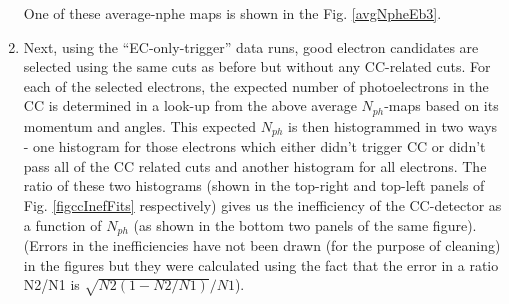 \begin{enumerate}
One of these average-nphe maps is shown in the Fig. \ref{avgNpheEb3}.  %


\item Next, using the ``EC-only-trigger'' %
data runs, %
good electron candidates are selected using the same cuts as before but without any CC-related cuts. %
For each of the selected electrons, the expected number of photoelectrons in the CC %
is determined in a look-up from %
the above average $N_{ph}$-maps based on its momentum and angles. This expected $N_{ph}$ is then histogrammed in two ways - one histogram for those electrons which either didn't trigger CC or didn't pass all of the CC related cuts and another histogram for all %
 electrons. The ratio of these two histograms (shown in the top-right and top-left panels of Fig. \ref{figccInefFits} respectively) gives us the inefficiency of the CC-detector as a function of $N_{ph}$ (as shown in the bottom two panels of the same figure). (Errors in the inefficiencies have not been drawn (for the purpose of cleaning) %
 in the figures but they were calculated using the fact that the error in a ratio N2/N1 is $\sqrt{N2(1-N2/N1)}/N1$). %


\end{enumerate}
